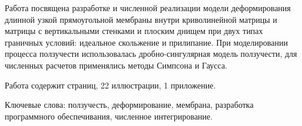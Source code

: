Работа посвящена разработке и численной реализации модели деформирования длинной узкой 
прямоугольной мембраны внутри криволинейной матрицы и матрицы с вертикальными стенками и плоским днищем
при двух типах граничных условий: идеальное скольжение и прилипание.
При моделировании процесса ползучести использовалась дробно-сингулярная
модель ползучести, для численных расчетов применялись методы Симпсона и Гаусса.

Работа содержит \pageref{LastPage} страниц, 22 иллюстрации, 1 приложение.



Ключевые слова: ползучесть, деформирование, мембрана, разработка программного обеспечивания, численное интегрирование.
\newpage